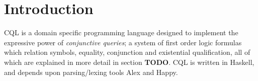 \section{Introduction}
CQL is a domain specific programming language designed to implement the expressive power of \textit{conjunctive queries}; a system of first order logic formulas which relation symbols, equality, conjunction and existential qualification, all of which are explained in more detail in section \textbf{TODO}. CQL is written in Haskell, and depends upon parsing/lexing tools Alex and Happy.